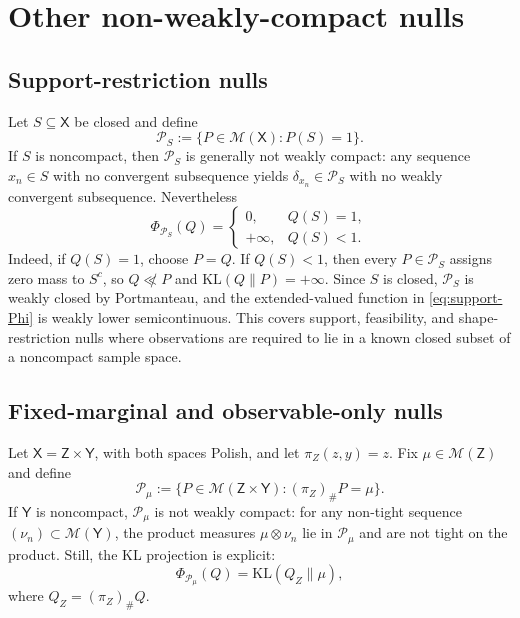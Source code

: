 \documentclass[11pt]{article}
\newcommand{\KL}{\mathrm{KL}}
\newcommand{\Pcal}{\mathcal{P}}
\newcommand{\X}{\mathsf{X}}
\newcommand{\M}{\mathcal{M}}
\theoremstyle{definition}
\theoremstyle{definition}
\begin{document}
\section{Other non-weakly-compact nulls}\label{app:more-examples}


\subsection{Support-restriction nulls}

Let \(S\subseteq\X\) be closed and define
\[
  \Pcal_S:=\{P\in\M(\X):P(S)=1\}.
\]
If \(S\) is noncompact, then \(\Pcal_S\) is generally not weakly compact: any sequence \(x_n\in S\) with no convergent subsequence yields \(\delta_{x_n}\in\Pcal_S\) with no weakly convergent subsequence.  Nevertheless
\begin{equation}\label{eq:support-Phi}
  \Phi_{\Pcal_S}(Q)
  =
  \begin{cases}
  0, & Q(S)=1,\\
  +\infty, & Q(S)<1.
  \end{cases}
\end{equation}
Indeed, if \(Q(S)=1\), choose \(P=Q\).  If \(Q(S)<1\), then every \(P\in\Pcal_S\) assigns zero mass to \(S^c\), so \(Q\not\ll P\) and \(\KL(Q\|P)=+\infty\).  Since \(S\) is closed, \(\Pcal_S\) is weakly closed by Portmanteau, and the extended-valued function in \eqref{eq:support-Phi} is weakly lower semicontinuous.  This covers support, feasibility, and shape-restriction nulls where observations are required to lie in a known closed subset of a noncompact sample space.

\subsection{Fixed-marginal and observable-only nulls}

Let \(\X=\mathsf Z\times\mathsf Y\), with both spaces Polish, and let \(\pi_Z(z,y)=z\).  Fix \(\mu\in\M(\mathsf Z)\) and define
\[
  \Pcal_\mu:=\{P\in\M(\mathsf Z\times\mathsf Y): (\pi_Z)_\#P=\mu\}.
\]
If \(\mathsf Y\) is noncompact, \(\Pcal_\mu\) is not weakly compact: for any non-tight sequence \((\nu_n)\subset\M(\mathsf Y)\), the product measures \(\mu\otimes\nu_n\) lie in \(\Pcal_\mu\) and are not tight on the product.  Still, the KL projection is explicit:
\begin{equation}\label{eq:fixed-marginal-Phi}
  \Phi_{\Pcal_\mu}(Q)=\KL(Q_Z\|\mu),
\end{equation}
where \(Q_Z=(\pi_Z)_\#Q\).
\end{document}
